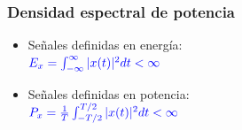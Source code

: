 \begin{frame}
  \frametitle{Densidad espectral de potencia}

  \begin{itemize}
    \begin{alertblock}{\centering Densidad espectral de Potencia}
      \vspace{0.2cm}
      \centering $\color{blue}\frac{1}{T}\int_{-T/2}^{T/2}|x(t)|^2dt$ \\ \vspace{0.2cm}
      \centering $\color{blue}\frac{1}{2\pi T}\int_{-\pi/T}^{\pi/T/2}|X(\omega)|^2d\omega$ \\ \vspace{0.2cm}
    \end{alertblock}
    \item {\small Señales definidas en energía: \\ \centering $\color{blue}E_x = \int_{-\infty}^{\infty}|x(t)|^2dt<\infty\color{blue}$}
    \item {\small Señales definidas en potencia: \\\centering $\color{blue}P_x = \frac{1}{T}\int_{-T/2}^{T/2}|x(t)|^2dt<\infty\color{blue}$}
    \end{itemize}
  
\end{frame}
